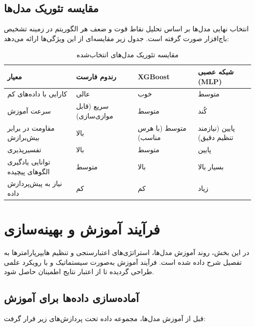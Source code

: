 \subsection{مقایسه تئوریک مدل‌ها}
انتخاب نهایی مدل‌ها بر اساس تحلیل نقاط قوت و ضعف هر الگوریتم در زمینه تشخیص باج‌افزار صورت گرفته است. جدول زیر مقایسه‌ای از این ویژگی‌ها ارائه می‌دهد:

\begin{table}[h]
    \centering
    \begin{tabular}{|p{3cm}|p{3.5cm}|p{3.5cm}|p{3.5cm}|}
        \hline
        \textbf{معیار} & \textbf{رندوم فارست} & \textbf{XGBoost} & \textbf{شبکه عصبی (MLP)} \\ \hline
        کارایی با داده‌های کم & عالی & خوب & متوسط \\ \hline
        سرعت آموزش & سریع (قابل موازی‌سازی) & متوسط & کُند \\ \hline
        مقاومت در برابر بیش‌برازش & بالا & متوسط (با هرس مناسب) & پایین (نیازمند تنظیم دقیق) \\ \hline
        تفسیرپذیری & بالا & متوسط & پایین \\ \hline
        توانایی یادگیری الگوهای پیچیده & متوسط & بالا & بسیار بالا \\ \hline
        نیاز به پیش‌پردازش داده & کم & کم & زیاد \\ \hline
    \end{tabular}
    \caption{مقایسه تئوریک مدل‌های انتخاب‌شده}
\end{table}

\section{فرآیند آموزش و بهینه‌سازی}
در این بخش، روند آموزش مدل‌ها، استراتژی‌های اعتبارسنجی و تنظیم هایپرپارامترها به تفصیل شرح داده شده است. فرآیند آموزش به‌صورت سیستماتیک و با رویکرد علمی طراحی گردیده تا از اعتبار نتایج اطمینان حاصل شود.

\subsection{آماده‌سازی داده‌ها برای آموزش}
قبل از آموزش مدل‌ها، مجموعه داده تحت پردازش‌های زیر قرار گرفت:

